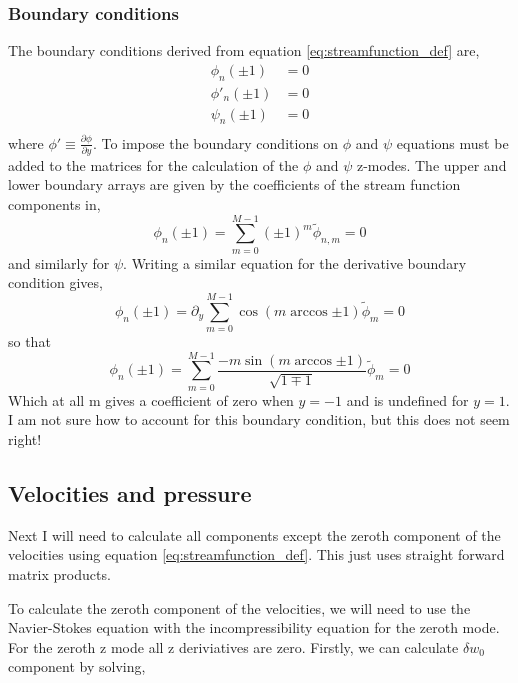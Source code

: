 \documentclass[12pt,a4paper]{article}
\newcommand{\sw}{\delta w}
\newcommand{\dd}[1]{\partial_{#1}}
\begin{document}
\subsubsection{Boundary conditions}

The boundary conditions derived from equation \ref{eq:streamfunction_def} are,
\begin{align}
     \phi_{n} \left( \pm 1 \right)  &= 0 \\ 
    \phi'_{n} \left( \pm 1 \right)  &= 0 \\
    \psi _{n} \left( \pm 1 \right)  &= 0 \\
\end{align}
where $\phi' \equiv \frac{\partial \phi}{ \partial y}$. To impose the boundary conditions on $\phi$ and $\psi$ equations must be added to the matrices for the calculation of the $\phi$ and $\psi$ z-modes. The upper and lower boundary arrays are given by the coefficients of the stream function components in,
\begin{equation}
    \phi_{n}(\pm 1) = \sum\limits_{m=0}^{M-1} (\pm1)^{m}\widetilde{\phi}_{n,m} = 0
\end{equation}
and similarly for $\psi$. Writing a similar equation for the derivative boundary condition gives,
\begin{equation}
    \phi_{n}(\pm 1) = \dd{y} \sum\limits_{m=0}^{M-1} \cos{\left(m\arccos{\pm 1} \right)}\widetilde{\phi}_{m} = 0
\end{equation}
so that
\begin{equation}
    \phi_{n}(\pm 1) = \sum\limits_{m=0}^{M-1} \frac{-m\sin{\left(m\arccos{\pm 1} \right)}}{\sqrt{1 \mp 1}}\widetilde{\phi}_{m} = 0
\end{equation}
Which at all m gives a coefficient of zero when $y=-1$ and is undefined for $y=1$. I am not sure how to account for this boundary condition, but this does not seem right!

\subsection{Velocities and pressure}

Next I will need to calculate all components except the zeroth component of the velocities using equation \ref{eq:streamfunction_def}. This just uses straight forward matrix products.

To calculate the zeroth component of the velocities, we will need to use the Navier-Stokes equation with the incompressibility equation for the zeroth mode. For the zeroth z mode all z deriviatives are zero. Firstly, we can calculate $\sw_{0}$ component by solving,
\end{document}

